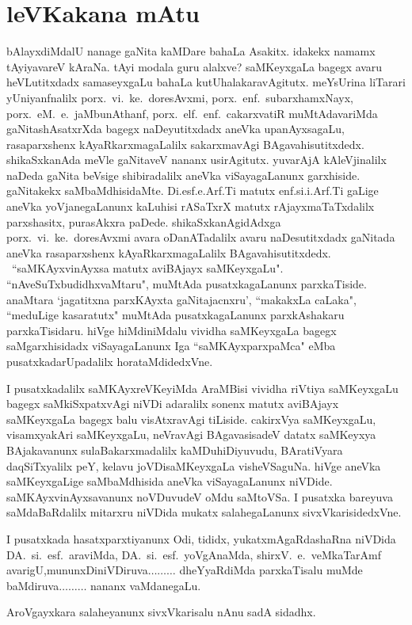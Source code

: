 \chapter*{leVKakana mAtu}
\vskip -25pt

bAlayxdiMdalU nanage gaNita kaMDare bahaLa Asakitx. idakekx namamx tAyiyavareV kAraNa. tAyi modala 
guru alalxve? saMKeyxgaLa bagegx avaru heVLutitxdadx samaseyxgaLu bahaLa kutUhalakaravAgitutx. 
meYsUrina liTarari yUniyanfnalilx porx.\ vi.~ke.\ doresAvxmi, porx.\ enf.\ subarxhamxNayx, 
porx.\ eM.\ e.\ jaMbunAthanf, porx.\ elf.~enf.~cakarxvatiR muMtAdavariMda gaNitashAsatxrXda bagegx    naDeyutitxdadx aneVka upanAyxsagaLu, rasaparxshenx kAyaR\-karxmagaLalilx sakarxmavAgi BAgavahisutitxdedx. shikaSxkanAda meVle gaNitaveV nananx usirAgitutx. yuvarAjA kAleVjinalilx naDeda gaNita beVsige shibiradalilx aneVka viSayagaLanunx garxhiside. gaNitakekx saMbaMdhisidaMte. Di.esf.e.Arf.Ti matutx enf.si.i.Arf.Ti gaLige aneVka yoVjanegaLanunx kaLuhisi rASaTxrX matutx rAjayxmaTaTxdalilx parxshasitx, purasAkxra paDede. shikaSxkanAgidAdxga porx.~vi.~ke.\ doresAvxmi avara oDanATadalilx avaru naDesutitxdadx gaNitada aneVka rasaparxshenx kAyaRkarxmagaLalilx BAgavahisutitxdedx. ~``saMKAyxvinAyxsa matutx aviBAjayx saMKeyxgaLu". ``nAveSuTx\-budidhxvaMtaru", muMtAda pusatxkagaLanunx parxkaTiside. anaMtara `jagatitxna parxKAyxta gaNitajacnxru', ``makakxLa caLaka", ``meduLige kasaratutx" muMtAda pusatxkagaLanunx parxkAshakaru parxkaTisidaru. hiVge hiMdiniMdalu vividha saMKeyxgaLa bagegx saMgarxhisidadx viSayagaLanunx Iga ``saMKAyxparxpaMca" eMba pusatxkadarUpadalilx horataMdidedxVne. 

I pusatxkadalilx saMKAyxreVKeyiMda AraMBisi vividha riVtiya saMKeyxgaLu bagegx saMkiSxpatxvAgi niVDi adaralilx sonenx matutx aviBAjayx saMKeyxgaLa bagegx balu visAtxravAgi tiLiside. cakirxVya saMKeyxgaLu, visamxyakAri saMKeyxgaLu, neVravAgi BAgavasisadeV datatx saMKeyxya BAjakavanunx sulaBakarxmadalilx kaMDuhiDiyuvudu, BAratiVyara daqSiTxyalilx peY, kelavu joVDisaMKeyxgaLa visheVSaguNa. hiVge aneVka saMKeyxgaLige saMbaMdhisida aneVka viSayagaLanunx niVDide. saMKAyxvinAyxsavanunx noVDuvudeV oMdu saMtoVSa. I pusatxka bareyuva saMdaBaRdalilx mitarxru niVDida mukatx salahegaLanunx sivxVkarisidedxVne.

I pusatxkada hasatxparxtiyanunx Odi, tididx, yukatxmAgaRdashaRna niVDida DA.~si.~esf.\ araviMda, DA.~si.~esf.~yoVgAnaMda, shirxV.~e.~veMkaTarAmf avarigU,\break mununxDiniVDiruva$\ldots\ldots\ldots$ dheYyaRdiMda parxkaTisalu muMde baMdiruva$\ldots\ldots\ldots$ nananx vaMdanegaLu.

AroVgayxkara salaheyanunx sivxVkarisalu nAnu sadA sidadhx.
